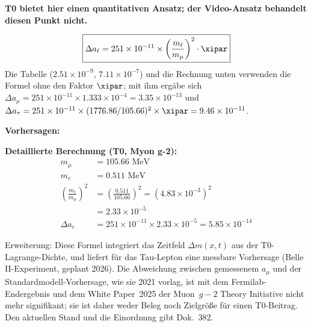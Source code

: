 	\begin{vorteil}
		\textbf{T0 bietet hier einen quantitativen Ansatz; der Video-Ansatz behandelt diesen Punkt nicht.}
		
		\begin{equation}
			\boxed{\Delta a_\ell = 251 \times 10^{-11} \times \left( \frac{m_\ell}{m_\mu} \right)^2 \cdot \xipar}
		\end{equation}
		Die Tabelle ($2.51\times10^{-9}$, $7.11\times10^{-7}$) und die Rechnung unten verwenden die Formel ohne den Faktor $\xipar$; mit ihm ergäbe sich $\Delta a_\mu = 251\times10^{-11}\times1.333\times10^{-4} = 3.35\times10^{-13}$ und $\Delta a_\tau = 251\times10^{-11}\times(1776.86/105.66)^2\times\xipar = 9.46\times10^{-11}$.
		
		\textbf{Vorhersagen:}
		\begin{center}
		\end{center}
		
		
		\textbf{Detaillierte Berechnung (T0, Myon g-2):}
		\begin{align}
			m_\mu &= 105.66 \text{ MeV} \\
			m_e &= 0.511 \text{ MeV} \\
			\left( \frac{m_e}{m_\mu} \right)^2 &= \left( \frac{0.511}{105.66} \right)^2 = (4.83 \times 10^{-3})^2 \\
			&= 2.33 \times 10^{-5} \\
			\Delta a_e &= 251 \times 10^{-11} \times 2.33 \times 10^{-5} = 5.85 \times 10^{-14}
		\end{align}
		
		
		Erweiterung: Diese Formel integriert das Zeitfeld $\Delta m(x,t)$ aus der T0-Lagrange-Dichte, und liefert für das Tau-Lepton eine messbare Vorhersage (Belle II-Experiment, geplant 2026). Die Abweichung zwischen gemessenem $a_\mu$ und der Standardmodell-Vorhersage, wie sie 2021 vorlag, ist mit dem Fermilab-Endergebnis und dem White Paper~2025 der Muon~$g-2$ Theory Initiative nicht mehr signifikant; sie ist daher weder Beleg noch Zielgröße für einen T0-Beitrag. Den aktuellen Stand und die Einordnung gibt Dok.~382.
	\end{vorteil}
	
